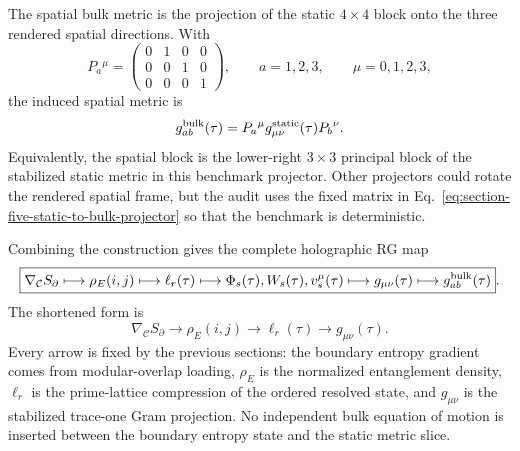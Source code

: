 \documentclass[11pt]{article}
\begin{document}
The spatial bulk metric is the projection of the static $4\times4$ block onto
the three rendered spatial directions.  With
\begin{equation}
\label{eq:section-five-static-to-bulk-projector}
 P_a{}^{\mu}
 =
 \begin{pmatrix}
 0&1&0&0\\
 0&0&1&0\\
 0&0&0&1
 \end{pmatrix},
 \qquad
 a=1,2,3,
 \qquad
 \mu=0,1,2,3,
\end{equation}
the induced spatial metric is
\begin{equation}
\label{eq:section-five-spatial-bulk-metric}
 g_{ab}^{\rm bulk}(\tau)
 =
 P_a{}^{\mu}
 g_{\mu\nu}^{\rm static}(\tau)
 P_b{}^{\nu}.
\end{equation}
Equivalently, the spatial block is the lower-right $3\times3$ principal block
of the stabilized static metric in this benchmark projector.  Other projectors
could rotate the rendered spatial frame, but the audit uses the fixed matrix in
Eq.~\eqref{eq:section-five-static-to-bulk-projector} so that the benchmark is
deterministic.

Combining the construction gives the complete holographic RG map
\begin{equation}
\label{eq:section-five-complete-rg-map}
 \boxed{
 \nabla_{\mathcal C}S_{\partial}
 \longmapsto
 \rho_E(i,j)
 \longmapsto
 \ell_r(\tau)
 \longmapsto
 \Phi_s(\tau),W_s(\tau),v_s^{\mu}(\tau)
 \longmapsto
 g_{\mu\nu}(\tau)
 \longmapsto
 g_{ab}^{\rm bulk}(\tau)
 }.
\end{equation}
The shortened form is
\begin{equation}
\label{eq:section-five-short-rg-map}
 \nabla_{\mathcal C}S_{\partial}
 \longrightarrow
 \rho_E(i,j)
 \longrightarrow
 \ell_r(\tau)
 \longrightarrow
 g_{\mu\nu}(\tau).
\end{equation}
Every arrow is fixed by the previous sections: the boundary entropy gradient
comes from modular-overlap loading, $\rho_E$ is the normalized entanglement
density, $\ell_r$ is the prime-lattice compression of the ordered resolved
state, and $g_{\mu\nu}$ is the stabilized trace-one Gram projection.  No
independent bulk equation of motion is inserted between the boundary entropy
state and the static metric slice.
\end{document}
